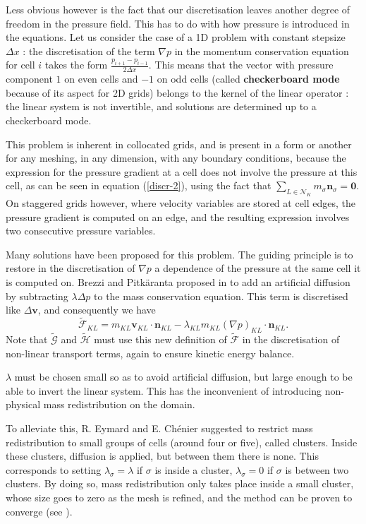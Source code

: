 \documentclass[12pt]{article}
\newcommand{\vb}[1]{\ensuremath{\boldsymbol #1}}
\begin{document}
Less obvious however is the fact that our discretisation leaves
another degree of freedom in the pressure field. This has to do with
how pressure is introduced in the equations. Let us consider the case
of a 1D problem with constant stepsize $\Delta x$ : the discretisation
of the term $\nabla p$ in the momentum conservation equation for cell
$i$ takes the form $\frac{p_{i+1} - p_{i-1}}{2 \Delta x}$. This means
that the vector with pressure component $1$ on even cells and $-1$ on
odd cells (called {\bf checkerboard mode} because of its aspect for 2D
grids) belongs to the kernel of the linear operator : the linear
system is not invertible, and solutions are determined up to a
checkerboard mode.

This problem is inherent in collocated grids, and is present in a form
or another for any meshing, in any dimension, with any boundary
conditions, because the expression for the pressure gradient at a cell
does not involve the pressure at this cell, as can be seen in equation
(\ref{discr-2}), using the fact that $\sum_{L \in \mathcal N _{K}}
m_\sigma \vb{n}_\sigma = \vb{0}$. On staggered grids however, where
velocity variables are stored at cell edges, the pressure gradient is
computed on an edge, and the resulting expression involves two
consecutive pressure variables.

Many solutions have been proposed for this problem. The guiding
principle is to restore in the discretisation of $\nabla p$ a
dependence of the pressure at the same cell it is computed on. Brezzi
and Pitk{\"a}ranta proposed in \cite{brezzip} to add an artificial
diffusion by subtracting $\lambda \Delta p$ to the mass conservation
equation. This term is discretised like $\Delta \vb{v}$, and
consequently we have $$\tilde{\mathcal{F}}_{KL} = m_{KL} \vb{v}_{KL}
\cdot \vb{n}_{KL} - \lambda_{KL} m_{KL} (\nabla p)_{KL} \cdot
\vb{n}_{KL} .$$ Note that $\tilde{\mathcal{G}}$ and
$\tilde{\mathcal{H}}$ must use this new definition of
$\tilde{\mathcal{F}}$ in the discretisation of non-linear transport
terms, again to ensure kinetic energy balance.

$\lambda$ must be chosen small so as to avoid artificial diffusion,
but large enough to be able to invert the linear system. This has the
inconvenient of introducing non-physical mass redistribution on the
domain.

To alleviate this, R. Eymard and E. Ch\'enier \cite{che-06-num}
suggested to restrict mass redistribution to small groups of cells
(around four or five), called clusters. Inside these clusters,
diffusion is applied, but between them there is none. This corresponds
to setting $\lambda_\sigma = \lambda$ if $\sigma$ is inside a cluster,
$\lambda_\sigma = 0$ if $\sigma$ is between two clusters. By doing so,
mass redistribution only takes place inside a small cluster, whose size
goes to zero as the mesh is refined, and the method can be proven to
converge (see \cite{eym-07-sta}).
\end{document}
